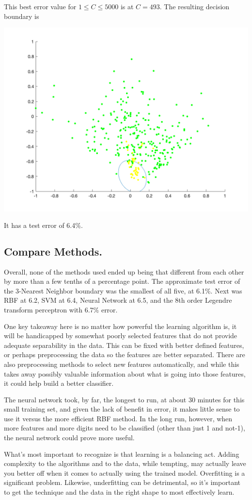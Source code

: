 \documentclass{article}
\begin{document}
\begin{enumerate}[(a)]
    This best error value for $1 \leq C \leq 5000$ is at $C = 493$. The resulting decision 
    boundary is

    \includegraphics[width=.8\textwidth]{svmfinal.png}

    It has a test error of 6.4\%.

\end{enumerate}


\subsection*{Compare Methods.}

Overall, none of the methods used ended up being that different from each other by more than
a few tenths of a percentage point.  The approximate test error of the 3-Nearest Neighbor boundary was the
smallest of all five, at 6.1\%. Next was RBF at 6.2, SVM at 6.4, Neural Network at 6.5, and 
the 8th order Legendre transform perceptron with 6.7\% error. 

One key takeaway here is no matter how powerful the learning algorithm is, it will be handicapped
by somewhat poorly selected features that do not provide adequate separability in the data. 
This can be fixed with better defined features, or perhaps preprocessing the data so the features
are better separated. There are also preprocessing methods to select new features automatically,
and while this takes away possibly valuable information about what is going into those features,
it could help build a better classifier.

The neural network took, by far, the longest to run, at about 30 minutes for this small training
set, and given the lack of benefit in error, it makes little sense to use it versus the more
efficient RBF method. In the long run, however, when more features and more digits need to be
classified (other than just 1 and not-1), the neural network could prove more useful.

What's most important to recognize is that learning is a balancing act. Adding complexity to
the algorithms and to the data, while tempting, may actually leave you better off when it comes
to actually using the trained model. Overfitting is a significant problem. Likewise, underfitting
can be detrimental, so it's important to get the technique and the data in the right shape to 
most effectively learn. 
\end{document}
